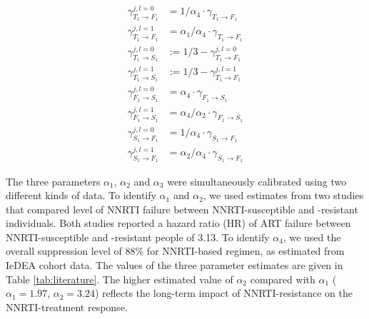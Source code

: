 \documentclass{article}
\begin{document}
\begin{align}
\gamma^{j,l=0}_{T_1\rightarrow F_1}&= 1/\alpha_4 \cdot \gamma_{T_1\rightarrow F_1}\label{eq1:nnrti_res}\\[8pt]
\gamma^{j,l=1}_{T_1\rightarrow F_1}&= \alpha_1/\alpha_4 \cdot \gamma_{T_1\rightarrow F_1}\\[8pt]
\gamma^{j,l=0}_{T_1\rightarrow S_1}&:=1/3 - \gamma^{j,l=0}_{T_1\rightarrow F_1}\\[8pt]
\gamma^{j,l=1}_{T_1\rightarrow S_1}&:=1/3 - \gamma^{j,l=1}_{T_1\rightarrow F_1}\\[8pt]
\gamma^{j,l=0}_{F_1\rightarrow S_1}&=\alpha_4\cdot \gamma_{F_1\rightarrow S_1}\\[8pt]
\gamma^{j,l=1}_{F_1\rightarrow S_1}&=\alpha_4/\alpha_2\cdot \gamma_{F_1\rightarrow S_1}\\[8pt]
\gamma^{j,l=0}_{S_1\rightarrow F_1}&= 1/\alpha_4 \cdot \gamma_{S_1\rightarrow F_1}\\[8pt]
\gamma^{j,l=1}_{S_1\rightarrow F_1}&= \alpha_2/\alpha_4 \cdot \gamma_{S_1\rightarrow F_1}\label{eq8:nnrti_res}
\end{align}

The three parameters $\alpha_1$, $\alpha_2$ and $\alpha_3$ were simultaneously calibrated using two different kinds of data. To identify $\alpha_1$ and $\alpha_2$, we used estimates from two studies that compared level of NNRTI failure between NNRTI-susceptible and -resistant individuals. Both studies reported a hazard ratio (HR) of ART failure between NNRTI-susceptible and -resistant people of 3.13. To identify $\alpha_4$, we used the overall suppression level of 88\% for NNRTI-based regimen, as estimated from IeDEA cohort data. The values of the three parameter estimates are given in Table \ref{tab:literature}. The higher estimated value of $\alpha_2$ compared with $\alpha_1$ ($\alpha_1=1.97$, $\alpha_2=3.24$) reflects the long-term impact of NNRTI-resistance on the NNRTI-treatment response.
\end{document}
